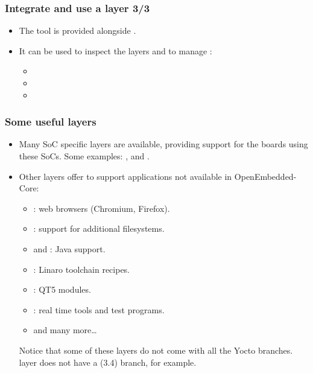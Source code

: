 \begin{frame}
  \frametitle{Integrate and use a layer 3/3}
  \begin{itemize}
    \item The  tool is provided alongside
      .
    \item It can be used to inspect the layers and to manage
      :
    \begin{itemize}
      \item {}
      \item {}
      \item {}
    \end{itemize}
  \end{itemize}
\end{frame}

\begin{frame}
  \frametitle{Some useful layers}
  \begin{itemize}
    \item Many SoC specific layers are available, providing support
      for the boards using these SoCs. Some examples: ,
       and .
    \item Other layers offer to support applications not available in
      OpenEmbedded-Core:
    \begin{itemize}
      \item {}: web browsers (Chromium, Firefox).
      \item {}: support for additional
        filesystems.
      \item {} and : Java support.
      \item {}: Linaro toolchain recipes.
      \item {}: QT5 modules.
      \item {}: real time tools and test programs.
      \item {} and many more\dots
    \end{itemize}
    Notice that some of these layers do not come with all the Yocto
    branches.  layer does not have a 
    (3.4) branch, for example.
  \end{itemize}
\end{frame}

